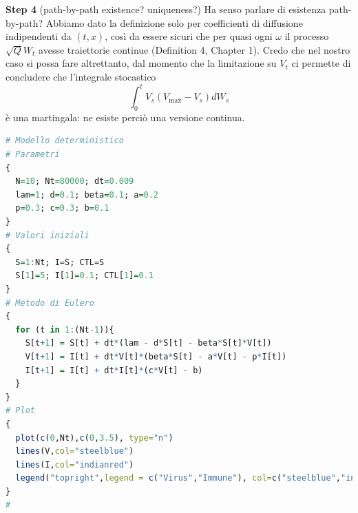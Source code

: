\documentclass[12pt,a4paper,oneside]{article}
\newcommand{\E}[1]{\mathrm{E}\left[#1\right]}
\renewcommand{\leq}{\leqslant}
\theoremstyle{definition}
\begin{document}
\textbf{Step 4} (path-by-path existence? uniqueness?) Ha senso parlare di esistenza path-by-path? Abbiamo dato la definizione solo per coefficienti di diffusione indipendenti da $(t,x)$, così da essere sicuri che per quasi ogni $\omega$ il processo $\sqrt{Q}W_t$ avesse traiettorie continue (Definition 4, Chapter 1). Credo che nel nostro caso si possa fare altrettanto, dal momento che la limitazione su $V_t$ ci permette di concludere che l'integrale stocastico $$\int_0^t V_s(V_{\max}-V_s) dW_s$$
è una martingala: ne esiste perciò una versione continua. 



\lstlistoflistings

\begin{lstlisting}[language=R, caption={\texttt{deterministico.R}}, label=lst:1] 
# Modello deterministico
# Parametri 
{
  N=10; Nt=80000; dt=0.009
  lam=1; d=0.1; beta=0.1; a=0.2
  p=0.3; c=0.3; b=0.1
}
# Valori iniziali
{
  S=1:Nt; I=S; CTL=S
  S[1]=5; I[1]=0.1; CTL[1]=0.1
}
# Metodo di Eulero
{
  for (t in 1:(Nt-1)){
    S[t+1] = S[t] + dt*(lam - d*S[t] - beta*S[t]*V[t])
    V[t+1] = I[t] + dt*V[t]*(beta*S[t] - a*V[t] - p*I[t]) 
    I[t+1] = I[t] + dt*I[t]*(c*V[t] - b)  
  }
}
# Plot
{
  plot(c(0,Nt),c(0,3.5), type="n")
  lines(V,col="steelblue")
  lines(I,col="indianred")
  legend("topright",legend = c("Virus","Immune"), col=c("steelblue","indianred"),lty=rep(1,2),horiz=FALSE, bty='n', cex=0.8)
}
#
\end{lstlisting}
\end{document}
